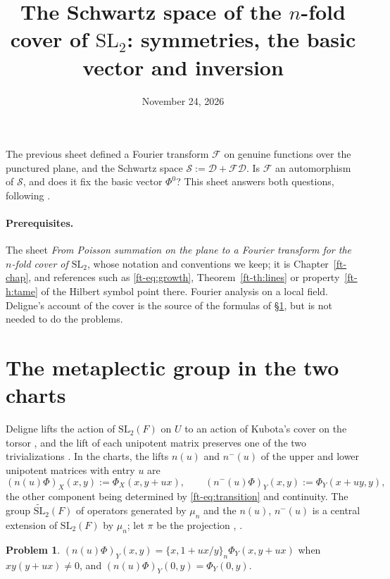 \documentclass[reqno]{amsart}
\title[The Schwartz space of the $n$-fold cover]{The Schwartz space of the
  $n$-fold cover of $\mathrm{SL}_2$: symmetries, the basic vector and
  inversion}
\author{}
\date{November 24, 2026}
\newcommand{\SL}{\mathrm{SL}_2}
\newcommand{\tSL}{\widetilde{\mathrm{SL}}_2}
\newcommand{\Fc}{\mathcal{F}}
\newcommand{\Dc}{\mathcal{D}}
\newcommand{\Sc}{\mathcal{S}}
\newcounter{chap}
\numberwithin{equation}{section}
\theoremstyle{definition}
\newtheorem{problem}{Problem}[section]
\theoremstyle{plain}
\begin{document}
\maketitle
{}\label{chap}

The previous sheet defined a Fourier transform $\Fc$ on genuine functions over the punctured plane, and the Schwartz space $\Sc := \Dc + \Fc \Dc$.  Is $\Fc$ an automorphism of $\Sc$, and does it fix the basic vector $\Phi^0$?  This sheet answers both questions, following \cite{N}.

\paragraph{Prerequisites.}
The sheet \emph{From Poisson summation on the plane to a Fourier transform for the $n$-fold cover of $\mathrm{SL}_2$}, whose notation and conventions we keep; it is Chapter~\ref{ft-chap}, and references such as \eqref{ft-eq:growth}, Theorem~\ref{ft-th:lines} or property~\ref{ft-h:tame} of the Hilbert symbol point there.  Fourier analysis on a local field.  Deligne's account of the cover \cite{Del} is the source of the formulas of \S\ref{sec:metaplectic}, but is not needed to do the problems.



\section{The metaplectic group in the two charts}\label{sec:metaplectic}

Deligne lifts the action of $\SL(F)$ on $U$ to an action of Kubota's cover on the torsor \cite[\S\S1.7, 1.9, 1.11--1.12, 3.7]{Del}, and the lift of each unipotent matrix preserves one of the two trivializations \cite[(1.14.3)]{Del}.  In the charts, the lifts $n(u)$ and $n^-(u)$ of the upper and lower unipotent matrices with entry $u$ are
\begin{equation*}
  (n(u) \Phi)_X(x, y) := \Phi_X(x, y + u x),
  \qquad
  (n^-(u) \Phi)_Y(x, y) := \Phi_Y(x + u y, y),
\end{equation*}
the other component being determined by \eqref{ft-eq:transition} and continuity.  The group $\tSL(F)$ of operators generated by $\mu_n$ and the $n(u)$, $n^-(u)$ is a central extension of $\SL(F)$ by $\mu_n$; let $\pi$ be the projection \cite[\S\S1.11--1.12, 3.7]{Del}, \cite[Proposition~5.1]{N}.

\begin{problem}\label{pr:unip-other-chart}
  $(n(u) \Phi)_Y(x, y) = \{x, 1 + u x / y\}_n \Phi_Y(x, y + u x)$ when $x y (y + u x) \neq 0$, and $(n(u) \Phi)_Y(0, y) = \Phi_Y(0, y)$.
\end{problem}
\end{document}
